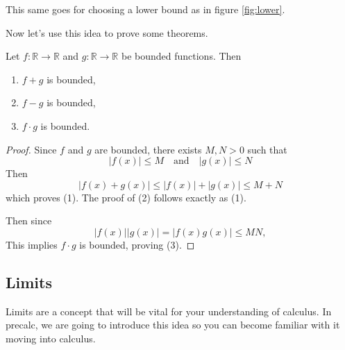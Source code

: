\documentclass[11pt]{article}
\numberwithin{lemma}{section}
\numberwithin{equation}{section}
\numberwithin{define}{section}
\numberwithin{prop}{section}
\numberwithin{figure}{section}
\numberwithin{theorem}{section}
\numberwithin{cor}{section}
\newcounter{ex}[section]
\numberwithin{ex}{section}
\def\real{\mathbb{R}}
\def\jand{\quad\text{and}\quad}
\begin{document}
This same goes for choosing a lower bound as in figure \eqref{fig:lower}.
\begin{figure}[h]
	\centering
	\caption{}
	\label{fig:lower}
\end{figure}

Now let's use this idea to prove some theorems.

\begin{theorem}
Let $f:\real\to\real$ and $g:\real\to\real$ be bounded functions. Then
\begin{enumerate}
	\item $f+g$ is bounded,
	\item $f-g$ is bounded,
	\item $f\cdot g$ is bounded.
\end{enumerate}	
\end{theorem}
\begin{proof}
	Since $f$ and $g$ are bounded, there exists $M,N>0$ such that
	$$|f(x)|\le M \jand |g(x)|\le N$$
	Then
	$$|f(x)+g(x)|\le |f(x)|+|g(x)|\le M+N$$
	which proves (1). The proof of (2) follows exactly as (1).
	
	Then since
	$$|f(x)||g(x)|=|f(x)g(x)|\le MN,$$
	This implies $f\cdot g$ is bounded, proving (3).
\end{proof}

\subsection{Limits}
Limits are a concept that will be vital for your understanding of calculus. In precalc, we are going to introduce this idea so you can become familiar with it moving into calculus.
\end{document}
